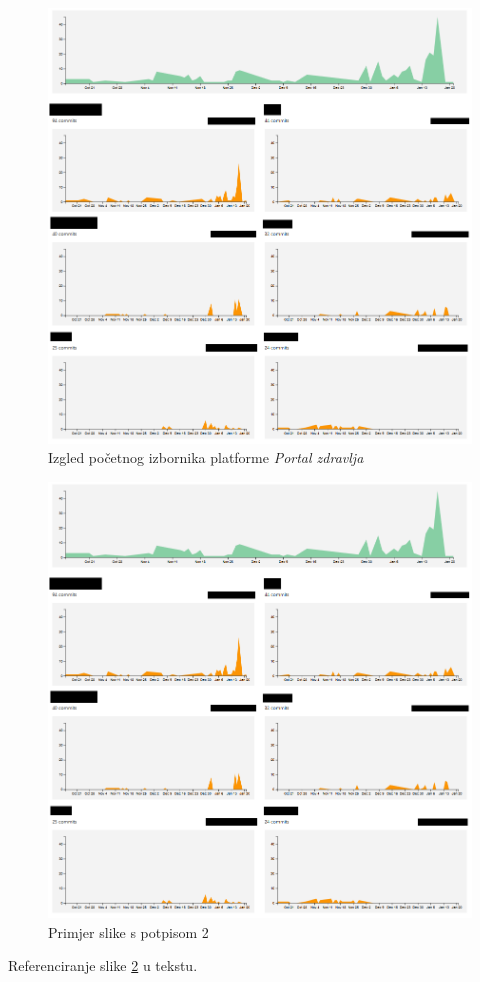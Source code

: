 		\begin{figure}[H]
			\includegraphics[scale=0.4]{slike/aktivnost.PNG} %
			\centering
			\caption{Izgled početnog izbornika platforme \textit{Portal zdravlja}}
			\label{fig:primjer}
		\end{figure}
		
		\begin{figure}[H]
			\includegraphics[width=\textwidth]{slike/aktivnost.PNG} %
			\caption{Primjer slike s potpisom 2}
			\label{fig:promjene2} %
		\end{figure}
		
		Referenciranje slike \ref{fig:promjene2} u tekstu.
		
		\eject
		
	